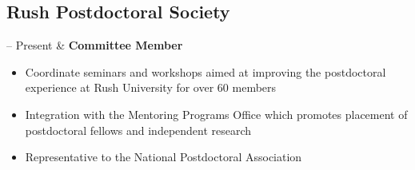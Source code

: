 \documentclass[10pt, letterpaper]{article}
\newcommand{\Duration}[2]{\fontsize{9pt}{0}\selectfont #1 -- #2}
\newcommand{\Ongoing}{Present} %
\newcommand{\Twoline}[2]{\textbf{#1}\newline  #2}
\begin{document}
\subsection{Rush Postdoctoral Society}
\begin{EntriesTable}

\Duration{2021}{\Ongoing} &
\Twoline{Committee Member}
{
\vspace{-0.4cm}
\begin{itemize}

\item Coordinate seminars and workshops aimed at improving the postdoctoral experience at Rush University for over 60 members

\item Integration with the Mentoring Programs Office which promotes placement of postdoctoral fellows and independent research 

\item Representative to the National Postdoctoral Association
\end{itemize}
}
\end{EntriesTable}

\vspace{-1cm}
\end{document}
